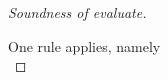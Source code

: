\begin{proof}[Soundness of evaluate]
{     %
    }

    {One rule applies, namely \\
    }


\end{proof}
